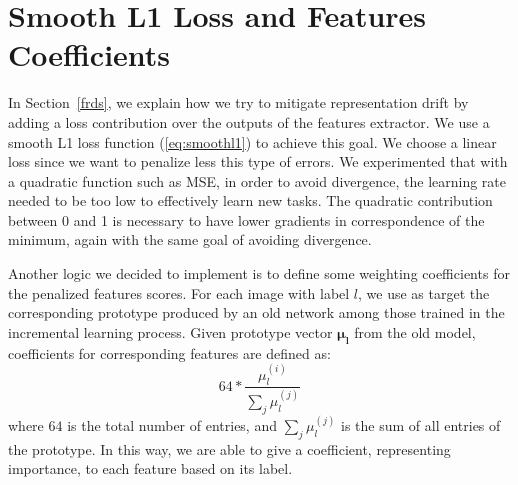\documentclass[10pt,twocolumn,letterpaper]{article}
\begin{document}
\appendix
\section{Smooth L1 Loss and Features Coefficients}
\label{appendix}
In Section~\ref{frds}, we explain how we try to mitigate representation drift by adding a loss contribution over the outputs of the features extractor. We use a smooth L1 loss function (\ref{eq:smoothl1}) to achieve this goal. We choose a linear loss since we want to penalize less this type of errors. We experimented that with a quadratic function such as MSE, in order to avoid divergence, the learning rate needed to be too low to effectively learn new tasks. The quadratic contribution between 0 and 1 is necessary to have lower gradients in  correspondence of the minimum, again with the same goal of avoiding divergence.

Another logic we decided to implement is to define some weighting coefficients for the penalized features scores. For each image with label $l$, we use as target the corresponding prototype produced by an old network among those trained in the incremental learning process. Given prototype vector $\bm{\mu_{l}}$ from the old model, coefficients for corresponding features are defined as:
\begin{equation}
    64 * \frac{\mu_{l}^{(i)}}{\sum_{j} \mu_{l}^{(j)}}
\end{equation}
where $64$ is the total number of entries, and $\sum_{j} \mu_{l}^{(j)}$ is the sum of all entries of the prototype. In this way, we are able to give a coefficient, representing importance, to each feature based on its label.

{\small


}
\end{document}
